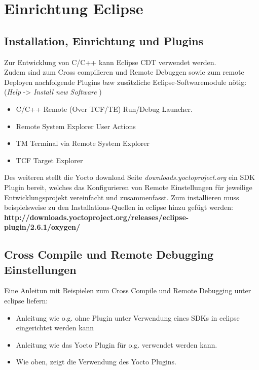 \chapter{Einrichtung Eclipse}%
\label{cha:setup_eclipse}

\section{Installation,  Einrichtung und Plugins}%
\label{sec:installation__einrichtung_plugins}

Zur Entwicklung von C/C++ kann Eclipse CDT verwendet werden. \\


Zudem sind zum Cross compilieren und Remote Debuggen sowie zum remote
Deployen nachfolgende Plugins bzw zusätzliche Eclipse-Softwaremodule nötig:
(\textit{Help} -> \textit{Install new Software} )

\begin{itemize}
    \item C/C++ Remote (Over TCF/TE) Run/Debug Launcher.
    \item Remote System Explorer User Actions
    \item TM Terminal via Remote System Explorer
    \item TCF Target Explorer
\end{itemize}

Des weiteren stellt die Yocto download Seite \textit{downloads.yoctoproject.org}
ein SDK Plugin bereit, welches das Konfigurieren von Remote Einstellungen
für jeweilige Entwicklungsprojekt vereinfacht und zusammenfasst. Zum
installieren muss beispielsweise zu den Installations-Quellen in eclipse
hinzu gefügt werden:  \newline
\textbf{http://downloads.yoctoproject.org/releases/eclipse-plugin/2.6.1/oxygen/}


\section{Cross Compile und Remote Debugging Einstellungen}%
\label{sec:cross_compile_und_remote_debugging_einstellungen}

Eine Anleitun mit Beispielen zum Cross Compile und Remote Debugging unter
eclipse liefern:
\begin{itemize}
    \item \textbf{\cite[Working with Eclipse]{PhyTec:Development_Guid}} Anleitung wie o.g. ohne Plugin
        unter Verwendung eines SDKs in eclipse eingerichtet werden kann
    \item \textbf{\cite[Seite
        249-269]{Gonzalez2018:Embedded_Linux_Development_Using_Yocto_Project_Cookbook_2nd}}
        Anleitung wie das Yocto Plugin für o.g. verwendet werden kann.
    \item \textbf{\cite{Variwiki:Yocto_Eclipse_Plugin}} Wie oben, zeigt die Verwendung des Yocto Plugins.

\end{itemize}
